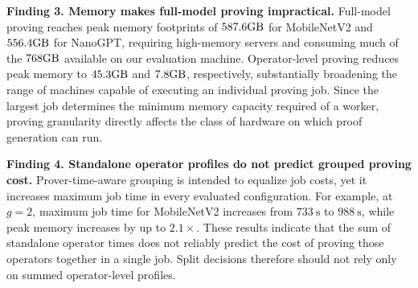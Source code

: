 \noindent\textbf{Finding 3. Memory makes full-model proving impractical.}
Full-model proving reaches peak memory footprints of
\(\qty[quantity-product = {}]{587.6}{\giga\byte}\) for MobileNetV2 and
\(\qty[quantity-product = {}]{556.4}{\giga\byte}\) for NanoGPT, requiring
high-memory servers and consuming much of the
\(\qty[quantity-product = {}]{768}{\giga\byte}\) available on our evaluation
machine. Operator-level proving reduces peak memory to
\(\qty[quantity-product = {}]{45.3}{\giga\byte}\) and
\(\qty[quantity-product = {}]{7.8}{\giga\byte}\), respectively,
substantially broadening the range of machines capable of executing an
individual proving job. Since the largest job determines the minimum memory
capacity required of a worker, proving granularity directly affects the class
of hardware on which proof generation can run.



\noindent\textbf{Finding 4. Standalone operator profiles do not predict grouped proving cost.}
Prover-time-aware grouping is intended to equalize job costs, yet it
increases maximum job time in every evaluated configuration. For example,
at \(g=2\), maximum job time for MobileNetV2 increases from
\(\qty[quantity-product = {}]{733}{\second}\) to
\(\qty[quantity-product = {}]{988}{\second}\), while peak memory increases
by up to \(\num{2.1}\times\). These results indicate that the sum of
standalone operator times does not reliably predict the cost of proving
those operators together in a single job. Split decisions therefore should
not rely only on summed operator-level profiles.




